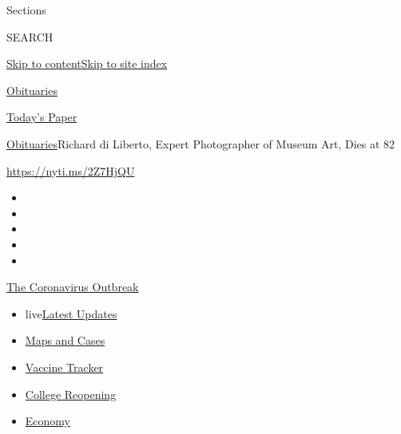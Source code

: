 Sections

SEARCH

\protect\hyperlink{site-content}{Skip to
content}\protect\hyperlink{site-index}{Skip to site index}

\href{https://www.nytimes3xbfgragh.onion/section/obituaries}{Obituaries}

\href{https://myaccount.nytimes3xbfgragh.onion/auth/login?response_type=cookie\&client_id=vi}{}

\href{https://www.nytimes3xbfgragh.onion/section/todayspaper}{Today's
Paper}

\href{/section/obituaries}{Obituaries}\textbar{}Richard di Liberto,
Expert Photographer of Museum Art, Dies at 82

\url{https://nyti.ms/2Z7HjQU}

\begin{itemize}
\item
\item
\item
\item
\item
\end{itemize}

\href{https://www.nytimes3xbfgragh.onion/news-event/coronavirus?action=click\&pgtype=Article\&state=default\&region=TOP_BANNER\&context=storylines_menu}{The
Coronavirus Outbreak}

\begin{itemize}
\tightlist
\item
  live\href{https://www.nytimes3xbfgragh.onion/2020/08/04/world/coronavirus-covid-19.html?action=click\&pgtype=Article\&state=default\&region=TOP_BANNER\&context=storylines_menu}{Latest
  Updates}
\item
  \href{https://www.nytimes3xbfgragh.onion/interactive/2020/us/coronavirus-us-cases.html?action=click\&pgtype=Article\&state=default\&region=TOP_BANNER\&context=storylines_menu}{Maps
  and Cases}
\item
  \href{https://www.nytimes3xbfgragh.onion/interactive/2020/science/coronavirus-vaccine-tracker.html?action=click\&pgtype=Article\&state=default\&region=TOP_BANNER\&context=storylines_menu}{Vaccine
  Tracker}
\item
  \href{https://www.nytimes3xbfgragh.onion/2020/08/02/us/covid-college-reopening.html?action=click\&pgtype=Article\&state=default\&region=TOP_BANNER\&context=storylines_menu}{College
  Reopening}
\item
  \href{https://www.nytimes3xbfgragh.onion/live/2020/08/03/business/stock-market-today-coronavirus?action=click\&pgtype=Article\&state=default\&region=TOP_BANNER\&context=storylines_menu}{Economy}
\end{itemize}

